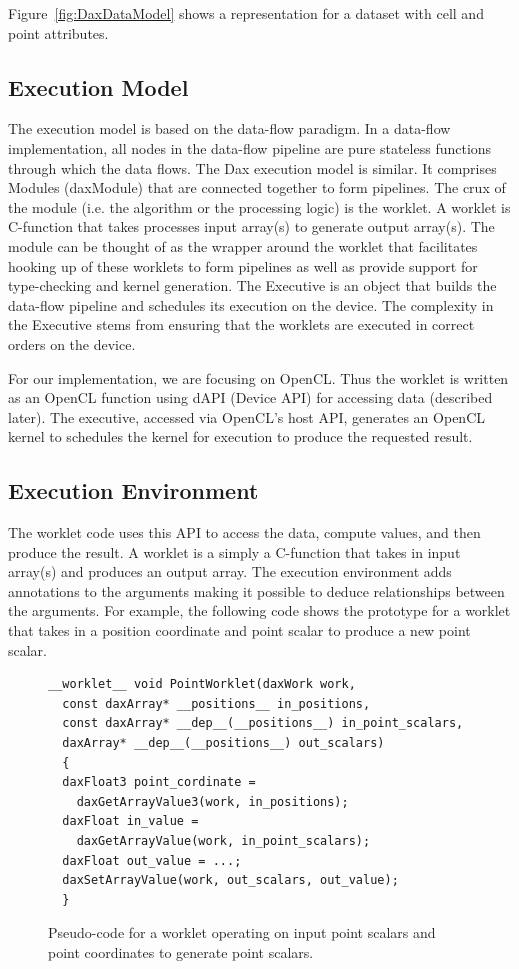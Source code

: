 \documentclass{vgtc}                          %
\begin{document}
Figure~\ref{fig:DaxDataModel} shows a representation for a dataset with cell
and point attributes.


\subsection{Execution Model}
\label{sec:ExecutionModel}

The execution model is based on the data-flow paradigm. In a data-flow
implementation, all nodes in the data-flow pipeline are pure stateless functions
through which the data flows. The Dax execution model is similar. It comprises
Modules (daxModule) that are connected together to form pipelines. The crux
of the module (i.e. the algorithm or the processing logic) is the worklet. A
worklet is C-function that takes processes input array(s) to generate output
array(s). The module can be thought of as the wrapper around the worklet that
facilitates hooking up of these worklets to form pipelines as well as provide
support for type-checking and kernel generation. The Executive
is an object that builds the data-flow pipeline and schedules its execution on
the device. The complexity in the Executive stems from ensuring that the
worklets are executed in correct orders on the device.

For our implementation, we are focusing on OpenCL. Thus the worklet is
written as an OpenCL function using dAPI (Device API) for accessing data
(described later). The executive, accessed via OpenCL's host API,
generates an OpenCL kernel to schedules the kernel for execution to produce
the requested result.

\subsection{Execution Environment}
\label{sec:ExecutionEnvironment}

The worklet code uses this API to access the data, compute values, and then
produce the result. A worklet is a simply a C-function that takes in input
array(s) and produces an output array. The execution environment adds annotations to the arguments
making it possible to deduce relationships between the arguments. For example, the
following code shows the prototype for a worklet that takes in a position
coordinate and point scalar to produce a new point scalar.

\begin{figure}[htbp]
\centering
\begin{lstlisting}[language=Dax]
__worklet__ void PointWorklet(daxWork work,
  const daxArray* __positions__ in_positions,
  const daxArray* __dep__(__positions__) in_point_scalars,
  daxArray* __dep__(__positions__) out_scalars)
  {
  daxFloat3 point_cordinate =
    daxGetArrayValue3(work, in_positions);
  daxFloat in_value =
    daxGetArrayValue(work, in_point_scalars);
  daxFloat out_value = ...;
  daxSetArrayValue(work, out_scalars, out_value);
  }
\end{lstlisting}
\caption{Pseudo-code for a worklet operating on input point scalars and point
coordinates to generate point scalars.}
\label{fig:DaxPointWorklet}
\end{figure}
\end{document}
